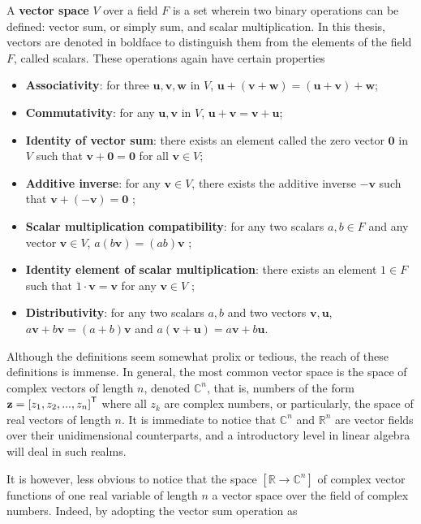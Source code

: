 \begin{definition}\label{def:vector_space}%
	A \textbf{vector space} $V$ over a field $F$ is a set wherein two binary operations can be defined: vector sum, or simply sum, and scalar multiplication. In this thesis, vectors are denoted in boldface to distinguish them from the elements of the field $F$, called scalars. These operations again have certain properties

\begin{itemize}
	\item \textbf{Associativity}: for three $\mathbf{u,v,w}$ in $V$, $\mathbf{u+(v+w)} = \mathbf{(u+v)+w}$;
	\item \textbf{Commutativity}: for any $\mathbf{u,v}$ in $V$, $\mathbf{u+v=v+u}$;
	\item \textbf{Identity of vector sum}: there exists an element called the zero vector $\mathbf{0}$ in $V$ such that $\mathbf{v+0 = 0}$ for all $\mathbf{v}\in V$;
	\item \textbf{Additive inverse}: for any $\mathbf{v}\in V$, there exists the additive inverse $-\mathbf{v}$ such that $\mathbf{v + (-v) = 0}$ ;
	\item \textbf{Scalar multiplication compatibility}: for any two scalars $a,b\in F$ and any vector $\mathbf{v}\in V$, $a(b\mathbf{v}) = (ab)\mathbf{v}$ ;
	\item \textbf{Identity element of scalar multiplication}: there exists an element $1\in F$ such that $1\cdot \mathbf{v} = \mathbf{v}$ for any $\mathbf{v}\in V$ ;
	\item \textbf{Distributivity}: for any two scalars $a,b$ and two vectors $\mathbf{v,u}$, $a\mathbf{v} + b\mathbf{v} = (a+b)\mathbf{v}$ and $a(\mathbf{v+u}) = a\mathbf{v} + b\mathbf{u}$.
\end{itemize}
\end{definition}

	Although the definitions seem somewhat prolix or tedious, the reach of these definitions is immense. In general, the most common vector space is the space of complex vectors of length $n$, denoted $\mathbb{C}^n$, that is, numbers of the form $\mathbf{z} = \left[z_1,z_2,...,z_n\right]^{\mathsf{T}}$ where all $z_k$ are complex numbers, or particularly, the space of real vectors of length $n$. It is immediate to notice that $\mathbb{C}^n$ and $\mathbb{R}^n$ are vector fields over their unidimensional counterparts, and a introductory level in linear algebra will deal in such realms.

	It is however, less obvious to notice that the space $\left[\mathbb{R}\to\mathbb{C}^n\right]$ of complex vector functions of one real variable of length $n$ a vector space over the field of complex numbers. Indeed, by adopting the vector sum operation as

